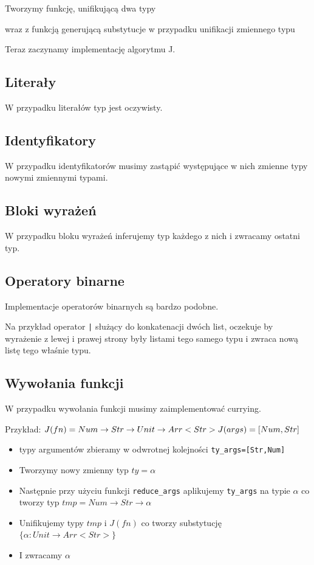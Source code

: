 \documentclass[a4paper,12pt]{book} %
\begin{document}
Tworzymy funkcję, unifikującą dwa typy

\newpage
wraz z funkcją generującą substytucje w przypadku unifikacji zmiennego typu

Teraz zaczynamy implementację algorytmu J.

\subsection{Literały}
W przypadku literałów typ jest oczywisty.


\subsection{Identyfikatory}
W przypadku identyfikatorów musimy zastąpić występujące w nich zmienne typy nowymi zmiennymi typami.
\newpage
\subsection{Bloki wyrażeń}
W przypadku bloku wyrażeń inferujemy typ każdego z nich i zwracamy ostatni typ.


\subsection{Operatory binarne}
Implementacje operatorów binarnych są bardzo podobne.

Na przykład operator \lstinline{|} służący do konkatenacji dwóch list, oczekuje by wyrażenie z lewej i prawej strony były listami tego samego typu i zwraca nową listę tego właśnie typu.

\subsection{Wywołania funkcji}
W przypadku wywołania funkcji musimy zaimplementować currying.

Przykład: $J(fn)=Num\rightarrow Str\rightarrow Unit\rightarrow Arr<Str>\\ J(args)=[Num,Str]$
\begin{itemize}
  \item typy argumentów zbieramy w odwrotnej kolejności \lstinline{ty_args=[Str,Num]}
  \item Tworzymy nowy zmienny typ $ty=\alpha$
  \item Następnie przy użyciu funkcji \lstinline{reduce_args} aplikujemy \lstinline{ty_args} na typie $\alpha$ co tworzy typ $tmp=Num\rightarrow Str\rightarrow \alpha$
  \item Unifikujemy typy $tmp$ i $J(fn)$ co tworzy substytucję $\{\alpha: Unit\rightarrow Arr<Str>\}$
  \item I zwracamy $\alpha$
\end{itemize}

\end{document}
